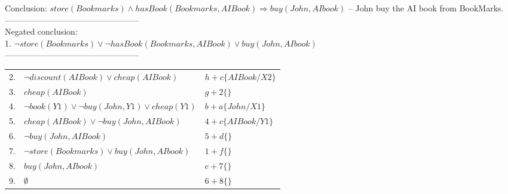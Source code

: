 \documentclass{article}%
\begin{document}
\begin{enumerate}
Conclusion: $ store(Bookmarks) \wedge hasBook(Bookmarks, AI Book) \Rightarrow buy(John, AI book) $ -- John buy the AI book from BookMarks. \\
------------------------------------------------\\
Negated conclusion:  \\
1. $ \neg store(Bookmarks) \vee \neg hasBook(Bookmarks, AI Book) \vee buy(John, AI book) $ \\
------------------------------------------------\\
\begin{tabular}{c|p{8cm}|l}
2. & $ \neg discount(AI Book) \vee cheap(AI Book) $ & $h + c \lbrace AI Book/X2 \rbrace $\\ 
3. & $ cheap(AI Book) $ &  $g + 2 \lbrace  \rbrace$ \\
4. & $ \neg book(Y1) \vee \neg buy(John,Y1)  \vee cheap(Y1) $& $b + a \lbrace John / X1 \rbrace$\\
5. & $ cheap(AI Book) \vee \neg buy(John,AI Book) $ &$ 4 + c \lbrace AI Book / Y1 \rbrace$\\
6. & $ \neg buy(John,AI Book) $ &$ 5 + d \lbrace \rbrace$\\
7. & $ \neg store(Bookmarks) \vee buy(John, AI book) $ &$ 1 + f \lbrace \rbrace$\\ 
8. & $ buy(John, AI book) $ &$ e + 7 \lbrace \rbrace$\\
9. & $ \emptyset $ &$ 6 + 8 \lbrace \rbrace$\\
\end{tabular} 

\end{enumerate}
\end{document}
